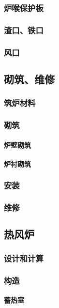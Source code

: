 \documentclass[UTF8]{../../ApplicationUniverse}
\begin{document}
        \subsubsection{炉喉保护板}
        \subsubsection{渣口、铁口}
        \subsubsection{风口}
    \subsection{砌筑、维修}
        \subsubsection{筑炉材料}
        \subsubsection{砌筑}
            \paragraph{炉壁砌筑}
            \paragraph{炉衬砌筑}
        \subsubsection{安装}
        \subsubsection{维修}
    \subsection{热风炉}
        \subsubsection{设计和计算}
        \subsubsection{构造}
            \paragraph{蓄热室}
\end{document}
